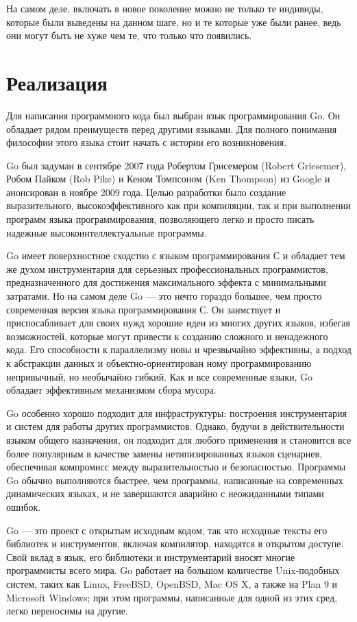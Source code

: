 \documentclass[14pt]{extarticle}
\begin{document}
	На самом деле, включать в новое поколение можно не только те индивиды, которые были выведены на данном шаге, но и те которые уже были ранее, ведь они могут быть не хуже чем те, что только что появились.
	\section{Реализация}
	Для написания программного кода был выбран язык программирования Go. Он обладает рядом преимуществ перед другими языками. Для полного понимания философии этого языка стоит начать с истории его возникновения.
	
	Go был задуман в сентябре 2007 года Робертом Грисемером (Robert Griesemer), Робом Пайком (Rob Pike) и Кеном Томпсоном (Ken Thompson) из Google и анонсирован в ноябре 2009 года. Целью разработки было создание выразительного, высокоэффек­тивного как при компиляции, так и при выполнении программ языка программирования, позволяющего легко и просто писать надежные высокоинтеллектуальные про­граммы.
	
	
	Go имеет поверхностное сходство с языком программирования С и обладает тем 	же духом инструментария для серьезных профессиональных программистов, предназначенного для достижения максимального эффекта с минимальными затратами. Но на самом деле Go --- это нечто гораздо большее, чем просто современная версия языка программирования С. Он заимствует и приспосабливает для своих нужд хорошие идеи из многих других языков, избегая возможностей, которые могут привести к созданию сложного и ненадежного кода. Его способности к параллелизму новы и чрезвычайно эффективны, а подход к абстракции данных и объектно-ориентирован­
	ному программированию непривычный, но необычайно гибкий. Как и все современные языки, Go обладает эффективным механизмом сбора мусора. 
	
	Go особенно хорошо подходит для инфраструктуры: построения инструментария и систем для работы других программистов. Однако, будучи в действительности языком общего назначения, он подходит для любого применения и становится все более популярным в качестве замены нетипизированных языков сценариев, обеспечивая компромисс между выразительностью и безопасностью. Программы Go обычно выполняются быстрее, чем программы, написанные на современных динамических языках, и не завершаются аварийно с неожиданными типами ошибок.
	
	
	Go --- это проект с открытым исходным кодом, так что исходные тексты его библиотек и инструментов, включая компилятор, находятся в открытом доступе. Свой вклад в язык, его библиотеки и инструментарий вносят многие программисты всего мира. Go работает на большом количестве Unix-подобных систем, таких как Linux, FreeBSD, OpenBSD, Mac OS X, а также на Plan 9 и Microsoft Windows; при этом программы, написанные для одной из этих сред, легко переносимы на другие. 
	
\end{document}
